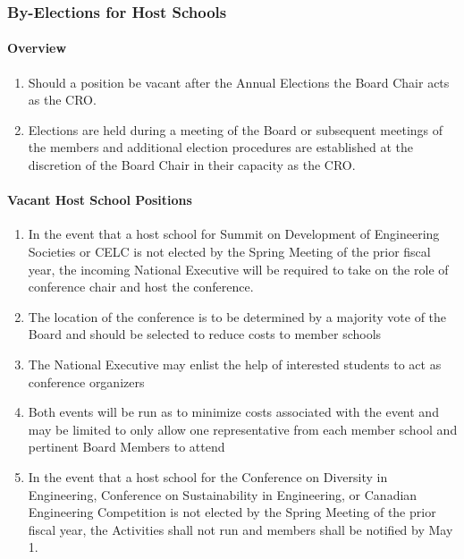 \subsubsection{By-Elections for Host Schools}
\label{by-elections-for-host-schools}

\paragraph{Overview}
\label{overview-1}

\begin{enumerate}
 \item
  Should a position be vacant after the Annual Elections the Board Chair acts as the CRO.
 \item
  Elections are held during a meeting of the Board or subsequent meetings of the members and additional election procedures are established at the discretion of the Board Chair in their capacity as the CRO.
\end{enumerate}

\paragraph{Vacant Host School Positions}
\label{vacant-host-school-positions}

\begin{enumerate}
 \item
  In the event that a host school for Summit on Development of Engineering Societies or CELC is not elected by the Spring Meeting of the prior fiscal year, the incoming National Executive will be required to take on the role of conference chair and host the conference.
 \item
  The location of the conference is to be determined by a majority vote of the Board and should be selected to reduce costs to member schools
 \item
  The National Executive may enlist the help of interested students to act as conference organizers
 \item
  Both events will be run as to minimize costs associated with the event and may be limited to only allow one representative from each member school and pertinent Board Members to attend
 \item
  In the event that a host school for the Conference on Diversity in Engineering, Conference on Sustainability in Engineering, or Canadian Engineering Competition is not elected by the Spring Meeting of the prior fiscal year, the Activities shall not run and members shall be notified by May 1.
\end{enumerate}


